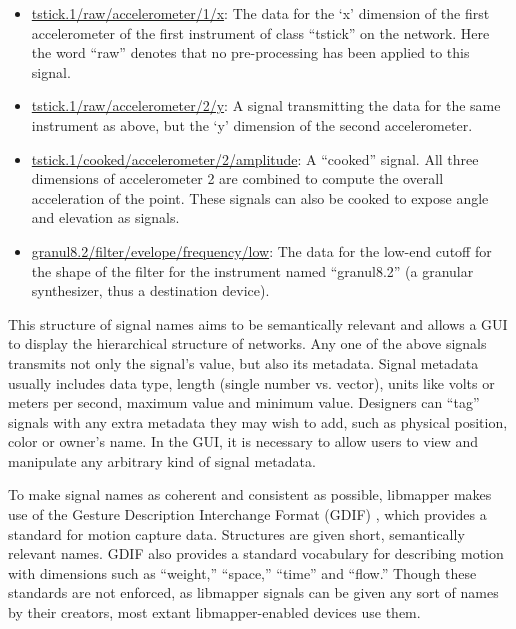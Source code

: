 	\begin{itemize}
	\item\url{tstick.1/raw/accelerometer/1/x}: The data for the `x' dimension of the first accelerometer of the first instrument of class ``tstick'' on the network. Here the word ``raw'' denotes that no pre-processing has been applied to this signal. 
	\item\url{tstick.1/raw/accelerometer/2/y}: A signal transmitting the data for the same instrument as above, but the `y' dimension of the second accelerometer.
	\item\url{tstick.1/cooked/accelerometer/2/amplitude}: A ``cooked'' signal. All three dimensions of accelerometer 2 are combined to compute the overall acceleration of the point. These signals can also be cooked to expose angle and elevation as signals.
	\item\url{granul8.2/filter/evelope/frequency/low}: The data for the low-end cutoff for the shape of the filter for the instrument named ``granul8.2'' (a granular synthesizer, thus a destination device).
	\end{itemize}

This structure of signal names aims to be semantically relevant and allows a GUI to display the hierarchical structure of networks. Any one of the above signals transmits not only the signal's value, but also its metadata. Signal metadata usually includes data type, length (single number vs. vector), units like volts or meters per second, maximum value and minimum value. Designers can ``tag'' signals with any extra metadata they may wish to add, such as physical position, color or owner's name. In the GUI, it is necessary to allow users to view and manipulate any arbitrary kind of signal metadata.

To make signal names as coherent and consistent as possible, libmapper makes use of the Gesture Description Interchange Format (GDIF) , which provides a standard for motion capture data. Structures are given short, semantically relevant names. GDIF also provides a standard vocabulary for describing motion with dimensions such as ``weight,'' ``space,'' ``time'' and ``flow.'' Though these standards are not enforced, as libmapper signals can be given any sort of names by their creators, most extant libmapper-enabled devices use them.


